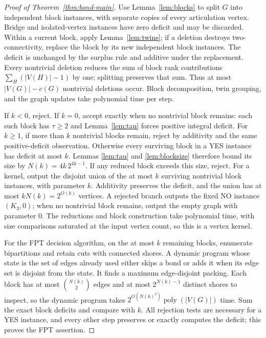 \documentclass[11pt]{article}
\newcommand{\poly}{\operatorname{poly}}
\begin{document}
\begin{proof}[Proof of Theorem~\ref{thm:bond-main}]
Use Lemma~\ref{lem:blocks} to split $G$ into independent block
instances, with separate copies of every articulation vertex.
Bridge and isolated-vertex instances have zero deficit and may be
discarded.  Within a current block, apply Lemma~\ref{lem:twins};
if a deletion destroys two-connectivity, replace the block by its
new independent block instances.  The deficit is unchanged by the
surplus rule and additive under the replacement.  Every nontrivial
deletion reduces the sum of block rank contributions
$\sum_H(|V(H)|-1)$ by one; splitting preserves that sum.  Thus at
most $|V(G)|-c(G)$ nontrivial deletions occur.  Block decomposition,
twin grouping, and the graph updates take polynomial time per step.

If $k<0$, reject.  If $k=0$, accept exactly when no nontrivial block
remains: each such block has $\tau\geq2$ and
Lemma~\ref{lem:tau} forces positive integral deficit.  For $k\geq1$,
if more than $k$ nontrivial blocks remain, reject by additivity and
the same positive-deficit observation.  Otherwise every surviving
block in a YES instance has deficit at most $k$.  Lemmas
\ref{lem:tau} and \ref{lem:blocksize} therefore bound its size by
$N(k)=4k\,2^{4k-1}$.  If any reduced block exceeds this size, reject.
For a kernel, output the disjoint union of the at most $k$ surviving
nontrivial block instances, with parameter $k$.  Additivity preserves
the deficit, and the union has at most $kN(k)=2^{O(k)}$ vertices.
A rejected branch outputs the fixed NO instance $(K_3,0)$; when no
nontrivial block remains, output the empty graph with parameter $0$.
The reductions and block construction take polynomial time, with
size comparisons saturated at the input vertex count, so this is a
vertex kernel.

For the FPT decision algorithm, on the at most $k$ remaining blocks,
enumerate bipartitions and
retain cuts with connected shores.  A dynamic program whose state is
the set of edges already used either skips a bond or adds it when its
edge set is disjoint from the state.  It finds a maximum edge-disjoint
packing.  Each block has at most $\binom{N(k)}2$ edges and at most
$2^{N(k)-1}$ distinct shores to inspect, so the dynamic program takes
$2^{O(N(k)^2)}\poly(|V(G)|)$ time.  Sum the exact block deficits
and compare with $k$.  All rejection tests are necessary for a YES
instance, and every other step preserves or exactly computes the
deficit; this proves the FPT assertion.
\end{proof}
\end{document}

